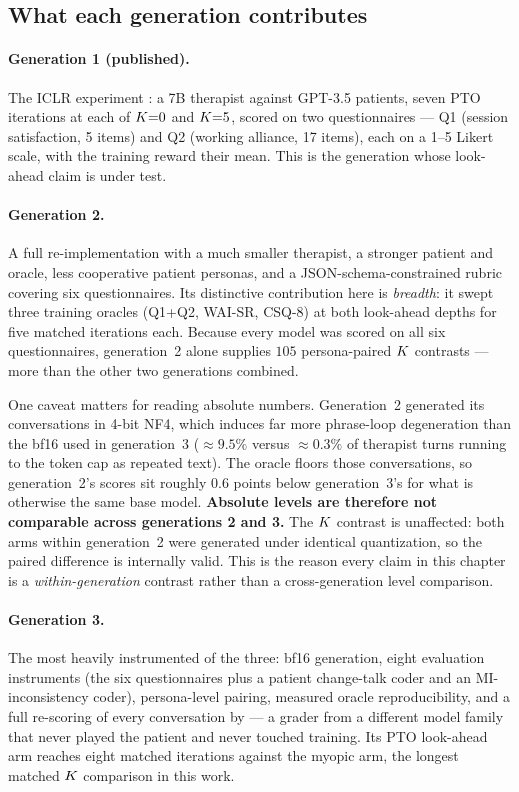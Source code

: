 \subsection{What each generation contributes}

\paragraph{Generation 1 (published).}
The ICLR experiment \citep{baruch2025pto}: a 7B therapist against GPT-3.5 patients, seven PTO
iterations at each of $K{=}0$ and $K{=}5$, scored on two questionnaires --- Q1 (session
satisfaction, 5 items) and Q2 (working alliance, 17 items), each on a 1--5 Likert scale, with
the training reward their mean. This is the generation whose look-ahead claim is under test.

\paragraph{Generation 2.}
A full re-implementation with a much smaller therapist, a stronger patient and oracle, less
cooperative patient personas, and a JSON-schema-constrained rubric covering six questionnaires.
Its distinctive contribution here is \emph{breadth}: it swept three training oracles
(Q1{+}Q2, WAI-SR, CSQ-8) at both look-ahead depths for five matched iterations each. Because
every model was scored on all six questionnaires, generation~2 alone supplies $105$
persona-paired $K$ contrasts --- more than the other two generations combined.

One caveat matters for reading absolute numbers. Generation~2 generated its conversations in
4-bit NF4, which induces far more phrase-loop degeneration than the bf16 used in generation~3
(${\approx}9.5\%$ versus ${\approx}0.3\%$ of therapist turns running to the token cap as
repeated text). The oracle floors those conversations, so generation~2's scores sit roughly
$0.6$ points below generation~3's for what is otherwise the same base model. \textbf{Absolute
levels are therefore not comparable across generations 2 and 3.} The $K$ contrast is
unaffected: both arms within generation~2 were generated under identical quantization, so the
paired difference is internally valid. This is the reason every claim in this chapter is a
\emph{within-generation} contrast rather than a cross-generation level comparison.

\paragraph{Generation 3.}
The most heavily instrumented of the three: bf16 generation, eight evaluation instruments (the
six questionnaires plus a patient change-talk coder and an MI-inconsistency coder),
persona-level pairing, measured oracle reproducibility, and a full re-scoring of every
conversation by \heldout{} --- a grader from a different model family that never played the
patient and never touched training. Its PTO look-ahead arm reaches eight matched iterations
against the myopic arm, the longest matched $K$ comparison in this work.

